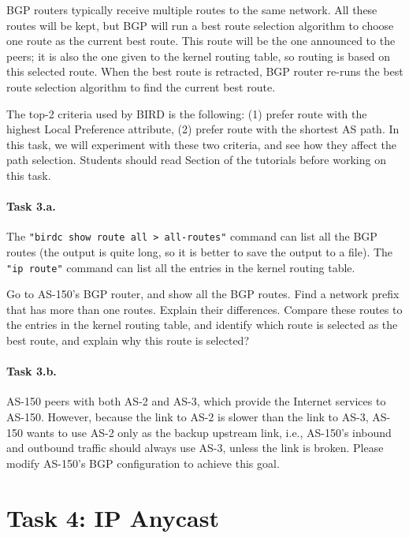 BGP routers typically receive multiple routes to the same network. 
All these routes will be kept, but BGP will run a best route 
selection algorithm to choose one route as the current best route. 
This route will be the one announced to the peers; 
it is also the one given to the kernel routing table, 
so routing is based on this selected route. 
When the best route is retracted, BGP router re-runs the 
best route selection algorithm to find the current best route. 

The top-2 criteria used by BIRD is the following:
(1) prefer route with the highest Local Preference attribute,
(2) prefer route with the shortest AS path. In this task, we will
experiment with these two criteria, and see how they affect 
the path selection. Students should read Section \pathselection 
of the tutorials before working on this task.


\paragraph{Task 3.a.} The \texttt{"birdc show route all > all-routes"} command
can list all the BGP routes (the output is quite long, so it is better to
save the output to a file). The \texttt{"ip route"} command
can list all the entries in the kernel routing table. 

Go to AS-150's BGP router, and show all the BGP routes. Find a network prefix
that has more than one routes. Explain their differences. Compare these 
routes to the entries in the kernel routing table, and identify which route is 
selected as the best route, and explain why this route is selected? 


\paragraph{Task 3.b.}
AS-150 peers with both AS-2 and AS-3, which provide the 
Internet services to AS-150.
However, because the link to AS-2 is slower than
the link to AS-3, AS-150 wants 
to use AS-2 only as the backup upstream link, i.e., 
AS-150's inbound and outbound traffic should 
always use AS-3, unless the link is broken. 
Please modify AS-150's BGP configuration to achieve this goal.



\section{Task 4: IP Anycast} 

